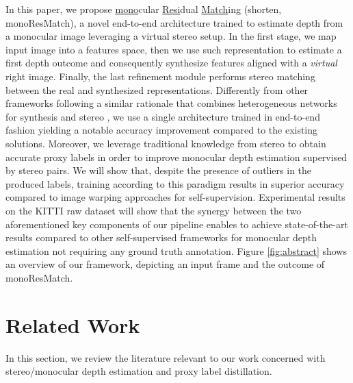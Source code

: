 \documentclass[10pt,twocolumn,letterpaper]{article}
\begin{document}
In this paper, we propose \underline{mono}cular \underline{Resi}dual \underline{Match}ing (shorten, monoResMatch), a novel end-to-end architecture trained to estimate depth from a monocular image leveraging a virtual stereo setup. In the first stage, we map input image into a features space, then we use such representation to estimate a first depth outcome and consequently synthesize features aligned with a \emph{virtual} right image. Finally, the last refinement module performs stereo matching between the real and synthesized representations.
Differently from other frameworks following a similar rationale \cite{luo2018single} that combines heterogeneous networks for synthesis \cite{xie2016deep3d} and stereo \cite{Mayer_2016_CVPR}, we use a single architecture trained in end-to-end fashion yielding a notable accuracy improvement compared to the existing solutions.
Moreover, we leverage traditional knowledge from stereo to obtain accurate proxy labels in order to improve monocular depth estimation supervised by stereo pairs. We will show that, despite the presence of outliers in the produced labels, training according to this paradigm results in superior accuracy compared to image warping approaches for self-supervision. 
Experimental results on the KITTI raw dataset \cite{KITTI_RAW} will show that the synergy between the two aforementioned key components of our pipeline enables to achieve state-of-the-art results compared to other self-supervised frameworks for monocular depth estimation not requiring any ground truth annotation.
Figure \ref{fig:abstract} shows an overview of our framework, depicting an input frame and the outcome of monoResMatch.



\section{Related Work}

In this section, we review the literature relevant to our work concerned with stereo/monocular depth estimation and proxy label distillation.
\end{document}
